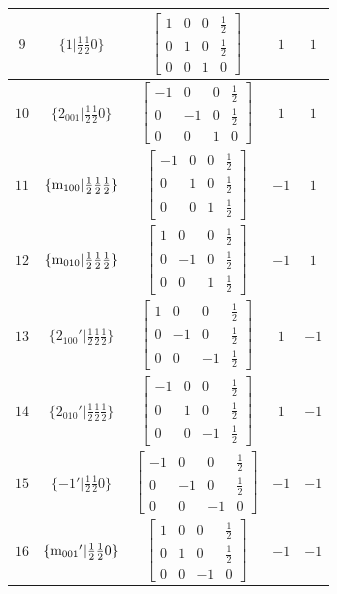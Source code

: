 \documentclass[fleqn,8pt]{jsarticle}
\begin{document}
\begin{longtable}{ccccc}
$ 9 $ & $ \{1|\frac{1}{2} \frac{1}{2} 0\} $ & $ \begin{bmatrix} 1 & 0 & 0 & \frac{1}{2} \\ 0 & 1 & 0 & \frac{1}{2} \\ 0 & 0 & 1 & 0 \end{bmatrix} $ & $ 1 $ & $ 1 $ \\ \hline
$ 10 $ & $ \{2{}_{001}|\frac{1}{2} \frac{1}{2} 0\} $ & $ \begin{bmatrix} -1 & 0 & 0 & \frac{1}{2} \\ 0 & -1 & 0 & \frac{1}{2} \\ 0 & 0 & 1 & 0 \end{bmatrix} $ & $ 1 $ & $ 1 $ \\ \hline
$ 11 $ & $ \{{\rm m}_{100}|\frac{1}{2} \frac{1}{2} \frac{1}{2}\} $ & $ \begin{bmatrix} -1 & 0 & 0 & \frac{1}{2} \\ 0 & 1 & 0 & \frac{1}{2} \\ 0 & 0 & 1 & \frac{1}{2} \end{bmatrix} $ & $ -1 $ & $ 1 $ \\ \hline
$ 12 $ & $ \{{\rm m}_{010}|\frac{1}{2} \frac{1}{2} \frac{1}{2}\} $ & $ \begin{bmatrix} 1 & 0 & 0 & \frac{1}{2} \\ 0 & -1 & 0 & \frac{1}{2} \\ 0 & 0 & 1 & \frac{1}{2} \end{bmatrix} $ & $ -1 $ & $ 1 $ \\ \hline
$ 13 $ & $ \{2{}_{100}{}'|\frac{1}{2} \frac{1}{2} \frac{1}{2}\} $ & $ \begin{bmatrix} 1 & 0 & 0 & \frac{1}{2} \\ 0 & -1 & 0 & \frac{1}{2} \\ 0 & 0 & -1 & \frac{1}{2} \end{bmatrix} $ & $ 1 $ & $ -1 $ \\ \hline
$ 14 $ & $ \{2{}_{010}{}'|\frac{1}{2} \frac{1}{2} \frac{1}{2}\} $ & $ \begin{bmatrix} -1 & 0 & 0 & \frac{1}{2} \\ 0 & 1 & 0 & \frac{1}{2} \\ 0 & 0 & -1 & \frac{1}{2} \end{bmatrix} $ & $ 1 $ & $ -1 $ \\ \hline
$ 15 $ & $ \{-1{}'|\frac{1}{2} \frac{1}{2} 0\} $ & $ \begin{bmatrix} -1 & 0 & 0 & \frac{1}{2} \\ 0 & -1 & 0 & \frac{1}{2} \\ 0 & 0 & -1 & 0 \end{bmatrix} $ & $ -1 $ & $ -1 $ \\ \hline
$ 16 $ & $ \{{\rm m}_{001}{}'|\frac{1}{2} \frac{1}{2} 0\} $ & $ \begin{bmatrix} 1 & 0 & 0 & \frac{1}{2} \\ 0 & 1 & 0 & \frac{1}{2} \\ 0 & 0 & -1 & 0 \end{bmatrix} $ & $ -1 $ & $ -1 $ \\
\end{longtable}
\end{document}
